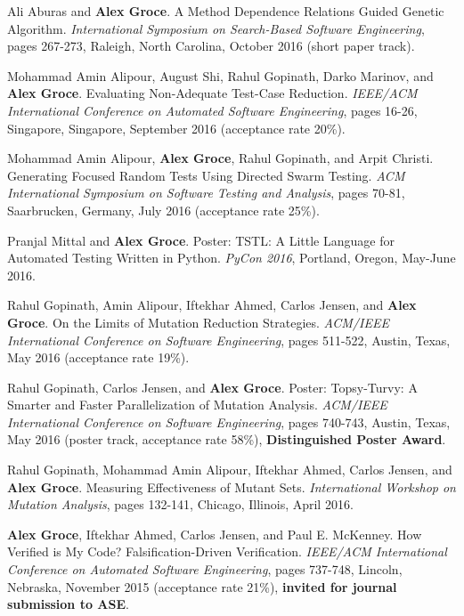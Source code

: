 \documentclass[ComputerScience]{vita}
\begin{document}
\begin{vita}
\begin{Refereed Conference and Workshop Publications}
\item Ali Aburas and {\bf Alex Groce}.
\newblock A Method Dependence Relations Guided Genetic Algorithm.
\newblock \emph{International Symposium on Search-Based Software Engineering}, pages 267-273, Raleigh, North Carolina, October 2016 (short paper track).

\item Mohammad Amin Alipour, August Shi, Rahul Gopinath, Darko Marinov, and {\bf Alex Groce}.
\newblock Evaluating Non-Adequate Test-Case Reduction.
\newblock \emph{IEEE/ACM International Conference on Automated Software Engineering}, pages 16-26, Singapore, Singapore, September 2016 (acceptance rate 20\%).

\item Mohammad Amin Alipour, {\bf Alex Groce}, Rahul Gopinath, and Arpit Christi.
\newblock Generating Focused Random Tests Using Directed Swarm Testing.
\newblock \emph{ACM International Symposium on Software Testing and Analysis}, pages 70-81, Saarbrucken, Germany, July 2016 (acceptance rate 25\%).

\item Pranjal Mittal and {\bf Alex Groce}.
\newblock Poster: TSTL: A Little Language for Automated Testing Written in Python.
\newblock \emph{PyCon 2016}, Portland, Oregon, May-June 2016.

\item Rahul Gopinath, Amin Alipour, Iftekhar Ahmed, Carlos Jensen, and {\bf Alex Groce}.
\newblock On the Limits of Mutation Reduction Strategies.
\newblock \emph{ACM/IEEE International Conference on Software Engineering}, pages 511-522, Austin, Texas, May 2016 (acceptance rate 19\%).

\item Rahul Gopinath, Carlos Jensen, and {\bf Alex Groce}.
\newblock Poster: Topsy-Turvy: A Smarter and Faster Parallelization of Mutation Analysis.
\newblock \emph{ACM/IEEE International Conference on Software Engineering}, pages 740-743, Austin, Texas, May 2016 (poster track, acceptance rate 58\%), {\bf Distinguished Poster Award}.

\item Rahul Gopinath, Mohammad Amin Alipour, Iftekhar Ahmed, Carlos Jensen, and {\bf Alex Groce}.
\newblock Measuring Effectiveness of Mutant Sets.
\newblock \emph{International Workshop on Mutation Analysis}, pages 132-141, Chicago, Illinois, April 2016.

\item {\bf Alex Groce}, Iftekhar Ahmed, Carlos Jensen, and Paul E. McKenney.
\newblock How Verified is My Code? Falsification-Driven Verification.
\newblock \emph{IEEE/ACM International Conference on Automated Software Engineering}, pages 737-748, Lincoln, Nebraska, November 2015 (acceptance rate 21\%), {\bf invited for journal submission to ASE}.


\end{Refereed Conference and Workshop Publications}
\end{vita}
\end{document}
